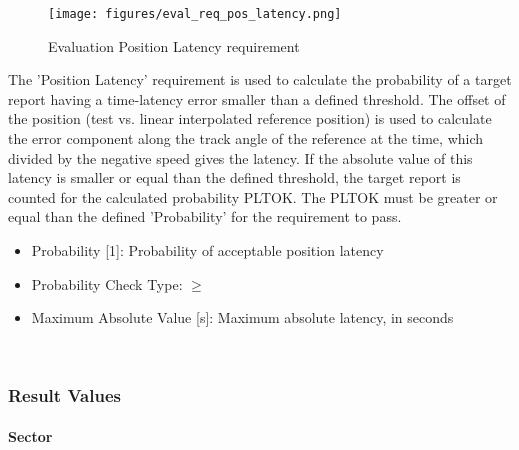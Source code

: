 \begin{figure}[H]
    \texttt{[image: figures/eval\_req\_pos\_latency.png]}
  \caption{Evaluation Position Latency requirement}
\end{figure}

The 'Position Latency' requirement is used to calculate the probability of a target report having a time-latency error smaller than a defined threshold. The offset of the position (test vs. linear interpolated reference position) is used to calculate the error component along the track angle of the reference at the time, which divided by the negative speed gives the latency. If the absolute value of this latency is smaller or equal than the defined threshold, the target report is counted for the calculated probability PLTOK. The PLTOK must be greater or equal than the defined 'Probability' for the requirement to pass. \\

\begin{itemize}  
\item Probability [1]: Probability of acceptable position latency
\item Probability Check Type: $\geq$
\item Maximum Absolute Value [s]: Maximum absolute latency, in seconds
\end{itemize}
\ \\

\subsubsection{Result Values}

\paragraph{Sector}

